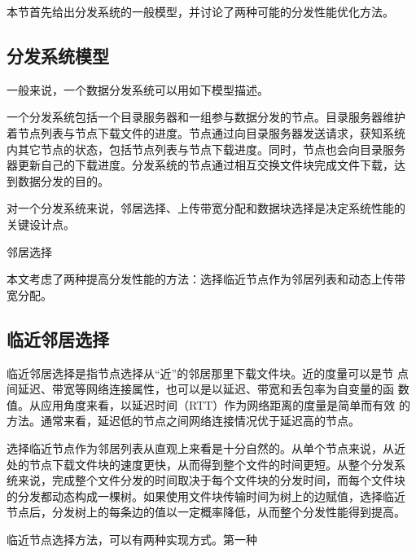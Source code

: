 本节首先给出分发系统的一般模型，并讨论了两种可能的分发性能优化方法。

\subsection{分发系统模型}

一般来说，一个数据分发系统可以用如下模型描述。

一个分发系统包括一个目录服务器和一组参与数据分发的节点。目录服务器维护
着节点列表与节点下载文件的进度。节点通过向目录服务器发送请求，获知系统
内其它节点的状态，包括节点列表与节点下载进度。同时，节点也会向目录服务
器更新自己的下载进度。分发系统的节点通过相互交换文件块完成文件下载，达
到数据分发的目的。


对一个分发系统来说，邻居选择、上传带宽分配和数据块选择是决定系统性能的
关键设计点。

邻居选择

% 



本文考虑了两种提高分发性能的方法：选择临近节点作为邻居列表和动态上传带
宽分配。

\subsection{临近邻居选择}


临近邻居选择是指节点选择从“近”的邻居那里下载文件块。近的度量可以是节
点间延迟、带宽等网络连接属性，也可以是以延迟、带宽和丢包率为自变量的函
数值。从应用角度来看，以延迟时间（RTT）作为网络距离的度量是简单而有效
的方法。通常来看，延迟低的节点之间网络连接情况优于延迟高的节点。


选择临近节点作为邻居列表从直观上来看是十分自然的。从单个节点来说，从近
处的节点下载文件块的速度更快，从而得到整个文件的时间更短。从整个分发系
统来说，完成整个文件分发的时间取决于每个文件块的分发时间，而每个文件块
的分发都动态构成一棵树。如果使用文件块传输时间为树上的边赋值，选择临近
节点后，分发树上的每条边的值以一定概率降低，从而整个分发性能得到提高。

临近节点选择方法，可以有两种实现方式。第一种

